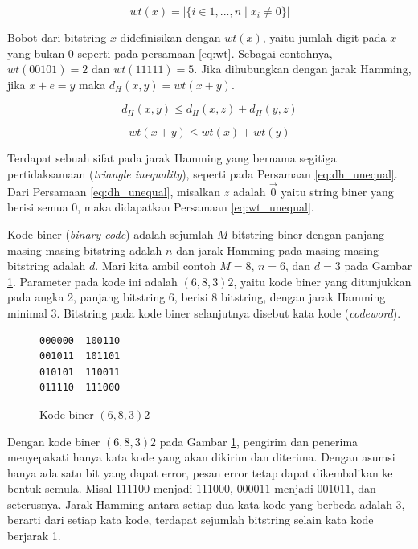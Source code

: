 \documentclass[conference,compsoc]{IEEEtran}
\begin{document}
\begin{equation}
wt(x) = |\{i \in {1,...,n} \mid x_i \neq 0\}|
\label{eq:wt}
\end{equation}

Bobot dari bitstring $x$ didefinisikan dengan $wt(x)$, yaitu jumlah digit pada $x$ yang bukan $0$ seperti pada persamaan \ref{eq:wt}. Sebagai contohnya, $wt(00101) = 2$ dan $wt(11111) = 5$. Jika dihubungkan dengan jarak Hamming, jika $x+e = y$ maka $d_H(x,y) = wt(x+y)$.

\begin{equation}
d_H(x,y) \le d_H(x,z) + d_H(y,z)
\label{eq:dh_unequal}
\end{equation}

\begin{equation}
wt(x+y) \le wt(x) + wt(y)
\label{eq:wt_unequal}
\end{equation}

Terdapat sebuah sifat pada jarak Hamming yang bernama segitiga pertidaksamaan (\textit{triangle inequality}), seperti pada Persamaan \ref{eq:dh_unequal}. Dari Persamaan \ref{eq:dh_unequal}, misalkan $z$ adalah $\vec{0}$ yaitu string biner yang berisi semua $0$, maka didapatkan Persamaan \ref{eq:wt_unequal}.

Kode biner (\textit{binary code}) adalah sejumlah $M$ bitstring biner dengan panjang masing-masing bitstring adalah $n$ dan jarak Hamming pada masing masing bitstring adalah $d$. Mari kita ambil contoh $M=8$, $n=6$, dan $d=3$ pada Gambar \ref{fig:binarycode683}. Parameter pada kode ini adalah $(6,8,3)2$, yaitu kode biner yang ditunjukkan pada angka 2, panjang bitstring 6, berisi 8 bitstring, dengan jarak Hamming minimal 3. Bitstring pada kode biner selanjutnya disebut kata kode (\textit{codeword}).

\begin{figure}
\centering
\begin{BVerbatim}
000000  100110
001011  101101
010101  110011
011110  111000
\end{BVerbatim}
\caption{Kode biner $(6,8,3)2$}
\label{fig:binarycode683}
\end{figure}

Dengan kode biner $(6,8,3)2$ pada Gambar \ref{fig:binarycode683}, pengirim dan penerima menyepakati hanya kata kode yang akan dikirim dan diterima. Dengan asumsi hanya ada satu bit yang dapat error, pesan error tetap dapat dikembalikan ke bentuk semula. Misal $111100$ menjadi $111000$, $000011$ menjadi $001011$, dan seterusnya. Jarak Hamming antara setiap dua kata kode yang berbeda adalah 3, berarti dari setiap kata kode, terdapat sejumlah bitstring selain kata kode berjarak 1.
\end{document}

